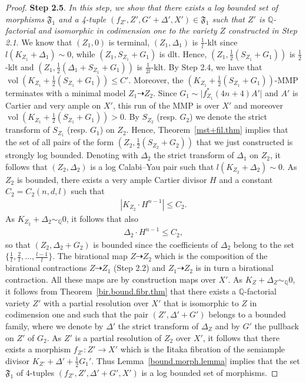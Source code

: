 \documentclass[11pt]{ip-journal}
\theoremstyle{definition}
\DeclareMathOperator{\vol}{\mathrm{vol}}
\newcommand{\bQ}{\mathbb{Q}}
\begin{document}
\begin{proof}
{\bf Step 2.5}. 
{\it 
In this step, we show that there exists a log bounded set of morphisms 
$\mathfrak{F}_1$ 
and a 4-tuple 
$(f_{Z'}, Z', G' +\Delta', X') 
\in \mathfrak{F}_1$ 
such that 
$Z'$ 
is 
$\mathbb{Q}$-factorial 
and isomorphic in codimension one to the variety 
$Z$ 
constructed in Step 2.1}.
\newline
We know that 
$(Z_1, 0)$ 
is terminal, 
$(Z_1, \Delta_1)$ 
is 
$\frac 1 l$-klt since $l(K_{Z_1}+\Delta_1)\sim 0$, 
while 
$(Z_1, S_{Z_1} + G_1)$ 
is dlt.
Hence, 
$(Z_1, \frac 1 2(S_{Z_1} + G_1))$ 
is 
$\frac 1 2$-klt 
and 
$(Z_1, \frac 1 2(\Delta_1+ S_{Z_1} + G_1))$ 
is 
$\frac{1}{2l}$-klt.
\newline
By Step 2.4, we have that
$\vol(K_{Z_1}+ \frac 1 2(S_{Z_1} + G_1)) \leq C'$.
Moreover, the 
$(K_{Z_1}+ \frac 1 2(S_{Z_1} + G_1))$-MMP terminates with a minimal model 
$Z_1 \dashrightarrow Z_2$. 
Since $G_1 \sim \vert f^\ast_{Z_1} (4n+4) A'\vert$ and $A'$ is Cartier and very ample on $X'$, this run of the MMP is over $X'$ and moreover $\vol(K_{Z_1}+ \frac 1 2(S_{Z_1} + G_1)) >0$.
By 
$S_{Z_2}$ 
(resp. 
$G_2$) 
we denote the strict transform of 
$S_{Z_1}$ 
(resp. 
$G_1$) 
on 
$Z_2$.
Hence, Theorem~\ref{mst+fil.thm} implies that the set of all pairs of the form 
$(Z_2, \frac 1 2(S_{Z_2} + G_2))$
that we just constructed 
is strongly log bounded.
\newline
Denoting with  $\Delta_2$ the strict transform of $\Delta_1$ on $Z_2$, it follows that $(Z_2, \Delta_2)$ is a log Calabi--Yau pair such that $l(K_{Z_2}+\Delta_2) \sim 0$.
As $Z_2$ is bounded, there exists a very ample Cartier divisor $H$ and a constant $C_2=C_2(n, d, l)$ such that 
\begin{align*}
|K_{Z_2} \cdot H^{n-1}| \leq C_2.
\end{align*}
As $K_{Z_2}+\Delta_2 \sim_\bQ 0$, it follows that also 
\begin{align*}
\Delta_2 \cdot H^{n-1} \leq C_2, 
\end{align*}
so that $(Z_2, \Delta_2 + G_2)$ is bounded since the coefficients of $\Delta_2$ belong to the set $\{\frac 1 l, \frac 2 l, \dots, \frac{l-1}{l}\}$.
The birational map $Z \dashrightarrow Z_2$ which is the composition of the birational contractions $Z \dashrightarrow Z_1$ (Step 2.2) and $Z_1 \dashrightarrow Z_2$ is in turn a birational contraction.
All these maps are by construction maps over $X'$. 
\newline
As $K_{Z}+\Delta_Z \sim_\mathbb{Q} 0$, it follows from Theorem~\ref{bir.bound.fibr.thm} that there exists a $\mathbb{Q}$-factorial variety $Z'$ with a partial resolution over $X'$ that is isomorphic to $Z$ in codimension one and such that the pair $(Z', \Delta'+G')$ belongs to a bounded family, where we denote by $\Delta'$ the strict transform of $\Delta_Z$ and by $G'$ the pullback on $Z'$ of $G_2$.
As $Z'$ is a partial resolution of $Z_2$ over $X'$, it follows that there exists a morphism $f_{Z'} \colon Z' \to X'$ which is the Iitaka fibration of the semiample divisor $K_{Z'}+\Delta'+ \frac{1}{2}G_1'$. 
Thus Lemma~\ref{bound.morph.lemma} implies that the set $\mathfrak{F}_1$ of 4-tuples $(f_{Z'}, Z', \Delta'+G', X')$ is a log bounded set of morphisms. 


\end{proof}
\end{document}

